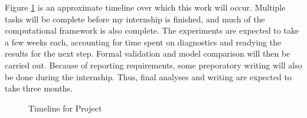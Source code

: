 Figure \ref{fig:time} is an approximate timeline over which this work will
occur.  Multiple tasks will be complete before my internship is finished, and
much of the computational framework is also complete. The experiments are
expected to take a few weeks each, accounting for time spent on diagnostics and
readying the results for the next step. Formal validation and model comparison
will then be carried out. Because of reporting requirements, some preporatory
writing will also be done during the internship. Thus, final analyses and
writing are expected to take three months. 

\begin{figure}[!htb]
  \caption{Timeline for Project}
  \label{fig:time}
\end{figure}

